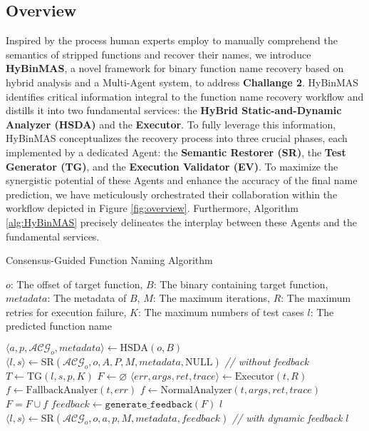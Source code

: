 \documentclass[acmsmall,screen,review,anonymous]{acmart} %
\begin{document}
\subsection{Overview}
Inspired by the process human experts employ to manually comprehend the semantics of stripped functions and recover their names, we introduce \textbf{HyBinMAS}, a novel framework for binary function name recovery based on hybrid analysis and a Multi-Agent system, to address \textbf{Challange 2}. HyBinMAS identifies critical information integral to the function name recovery workflow and distills it into two fundamental services: the \textbf{HyBrid Static-and-Dynamic Analyzer (HSDA)} and the \textbf{Executor}. To fully leverage this information, HyBinMAS conceptualizes the recovery process into three crucial phases, each implemented by a dedicated Agent: the \textbf{Semantic Restorer (SR)}, the \textbf{Test Generator (TG)}, and the \textbf{Execution Validator (EV)}. To maximize the synergistic potential of these Agents and enhance the accuracy of the final name prediction, we have meticulously orchestrated their collaboration within the workflow depicted in Figure \ref{fig:overview}. Furthermore, Algorithm \ref{alg:HyBinMAS} precisely delineates the interplay between these Agents and the fundamental services.
\begin{algorithm}
  \caption{Consensus-Guided Function Naming Algorithm}
  \label{alg:HyBinMAS}
  \begin{algorithmic}[1]
    \REQUIRE $o$: The offset of target function, $B$: The binary containing target function, $metadata$: The metadata of $B$, $M$: The maximum iterations, $R$: The maximum retries for execution failure, $K$: The maximum numbers of test cases
    \ENSURE $l$: The predicted function name

    \STATE $\langle a, p, \mathcal{ACG}_o, metadata \rangle \gets \text{HSDA}(o, B)$
    \STATE $\langle l, s \rangle \gets \text{SR}(\mathcal{ACG}_o, o, A, P, M, metadata, \text{NULL})$ \textit{// without feedback}
        \STATE $T \gets \text{TG}(l, s, p, K)$
        \STATE $F \gets \varnothing$
            \STATE $\langle err, args, ret, trace \rangle \gets \text{Executor}(t, R)$
                \STATE $f \gets \text{FallbackAnalyer}(t, err)$
            \ELSE
                \STATE $f \gets \text{NormalAnalyzer}(t, args, ret, trace)$
            \ENDIF
            \STATE $F = F \cup f $
        \ENDFOR
        \STATE $feedback \gets \texttt{generate\_feedback}(F)$
            \RETURN $l$
        \ENDIF
        \STATE $\langle l, s \rangle \gets \text{SR}(\mathcal{ACG}_o, o, a, p, M, metadata, feedback)$ \textit{// with dynamic feedback}
    \ENDFOR
    \RETURN $l$
  \end{algorithmic}
\end{algorithm}
\end{document}
